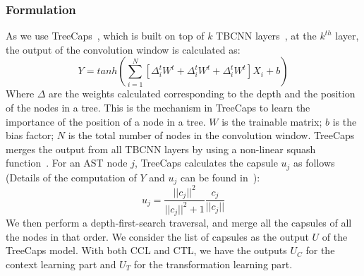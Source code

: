 \subsubsection*{\bf Formulation}
As we use TreeCaps~\cite{bui2021treecaps}, which is built on top of
$k$ TBCNN layers~\cite{mou2014tbcnn}, at the $k^{th}$ layer, the
output of the convolution window is calculated as:
\begin{equation}\label{eq:treecaps}
	Y = tanh(\sum_{i=1}^{N}[\Delta^t_iW^t + \Delta^t_iW^t + \Delta^t_iW^t]X_i + b)
\end{equation}
Where $\Delta$ are the weights calculated corresponding to the depth
and the position of the nodes in a tree. This is the mechanism in
TreeCaps to learn the importance of the position of a node in a
tree. $W$ is the trainable matrix; $b$ is the bias factor; $N$ is the
total number of nodes in the convolution window. TreeCaps merges the
output from all TBCNN layers by using a non-linear squash
function~\cite{sabour2017dynamic}. For an AST node $j$, TreeCaps
calculates the capsule $u_j$ as follows (Details of the computation of
$Y$ and $u_j$ can be found in~\cite{bui2021treecaps}):
\begin{equation}\label{eq:2}
	u_j = \frac{||c_j||^2}{||c_j||^2+1}\frac{c_j}{||c_j||}
\end{equation}
We then perform a depth-first-search traversal, and merge all the
capsules of all the nodes in that order. We consider the list of
capsules as the output $U$ of the TreeCaps model. With both
CCL and CTL, we have the outputs $U_C$ for the context
learning part and $U_T$ for the transformation learning part.

